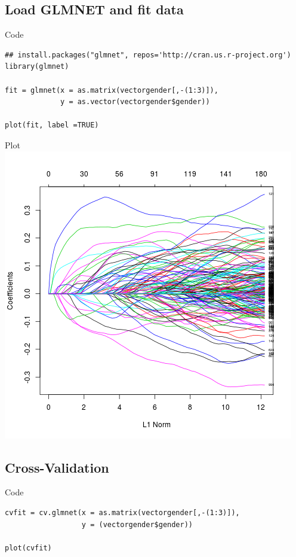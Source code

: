 \documentclass[bigger]{beamer}
\begin{document}
\subsection{Load GLMNET and fit data}
\label{sec-1-1}

\begin{frame}[fragile,label=sec-1-1-1]{Code}
 \begin{verbatim}
## install.packages("glmnet", repos='http://cran.us.r-project.org')
library(glmnet)

fit = glmnet(x = as.matrix(vectorgender[,-(1:3)]),
             y = as.vector(vectorgender$gender))

plot(fit, label =TRUE)
\end{verbatim}
\end{frame}

\begin{frame}[label=sec-1-1-2]{Plot}
\includegraphics[width=.9\linewidth]{coeffplot.png}
\end{frame}

\subsection{Cross-Validation}
\label{sec-1-2}

\begin{frame}[fragile,label=sec-1-2-1]{Code}
 \begin{verbatim}
cvfit = cv.glmnet(x = as.matrix(vectorgender[,-(1:3)]),
                  y = (vectorgender$gender))

plot(cvfit)
\end{verbatim}
\end{frame}
\end{document}
